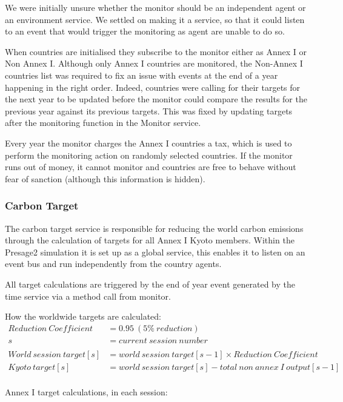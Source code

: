 We were initially unsure whether the monitor should be an independent agent or an environment service. We settled on making it a service, so that it could listen to an event that would trigger the monitoring as agent are unable to do so.

When countries are initialised they subscribe to the monitor either as Annex I or Non Annex I. Although only Annex I countries are monitored, the Non-Annex I countries list was required to fix an issue with events at the end of a year happening in the right order. Indeed, countries were calling for their targets for the next year to be updated before the monitor could compare the results for the previous year against its previous targets. This was fixed by updating targets after the monitoring function in the Monitor service.

Every year the monitor charges the Annex I countries a tax, which is used to perform the monitoring action on randomly selected countries. If the monitor runs out of money, it cannot monitor and countries are free to behave without fear of sanction (although this information is hidden).

\subsubsection{Carbon Target}

The carbon target service is responsible for reducing the world carbon emissions through the calculation of targets for all Annex I Kyoto members. Within the Presage2 simulation it is set up as a global service, this enables it to listen on an event bus and run independently from the country agents.
 
All target calculations are triggered by the end of year event generated by the time service via a method call from monitor.

How the worldwide targets are calculated:
\begin{align*}
Reduction~Coefficient&= 0.95 ~ (5\%~reduction) \\
s &= current~session~number\\
\\
World~session~target[s] &= world~session~target [s - 1] \times Reduction~Coefficient\\
Kyoto~target [s] &= world~session~target [s] - total~non~annex~I~output [s - 1]\\
\end{align*}

Annex I target calculations, in each session:

